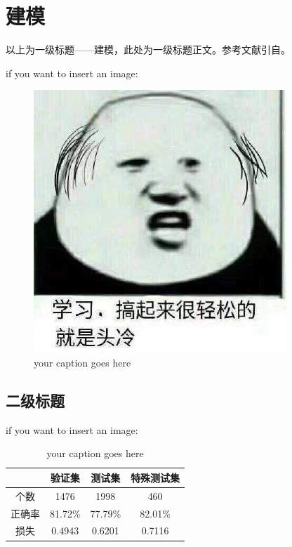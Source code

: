 
\chapter{建模}%
以上为一级标题——建模，此处为一级标题正文。参考文献引自\cite{ctex-doc}。

\par if you want to insert an image:
\begin{figure}[H]
	\centering
	\includegraphics[scale=1]{img/testImg}
	\caption{your caption goes here}
\end{figure}
\section{二级标题}


\par if you want to insert an image:
\begin{table}[H]
\centering
\begin{tabular}{|c|c|c|c|}
\hline
    & 验证集     & 测试集     & 特殊测试集   \\ \hline
个数  & 1476    & 1998    & 460     \\ \hline
正确率 & 81.72\% & 77.79\% & 82.01\% \\ \hline
损失  & 0.4943  & 0.6201  & 0.7116  \\ \hline
\end{tabular}
\caption{your caption goes here}
\end{table}


